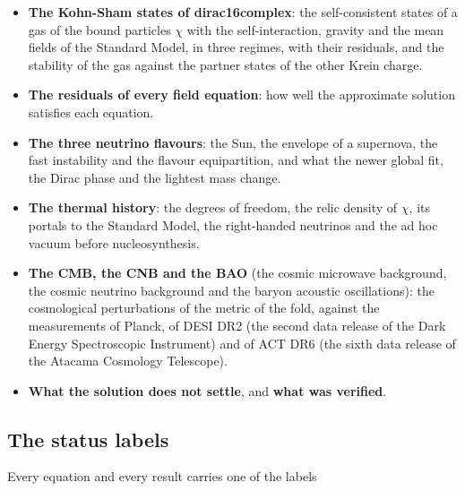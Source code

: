 \documentclass[
  10pt,
]{article}
\begin{document}
\begin{itemize}
  dirac16complex (the \(x_0\) mass), the speed of the bound particles
  \(\chi\) and the shortcut through the bulk.
\item
  \textbf{The Kohn-Sham states of dirac16complex}: the self-consistent
  states of a gas of the bound particles \(\chi\) with the
  self-interaction, gravity and the mean fields of the Standard Model,
  in three regimes, with their residuals, and the stability of the gas
  against the partner states of the other Krein charge.
\item
  \textbf{The residuals of every field equation}: how well the
  approximate solution satisfies each equation.
\item
  \textbf{The three neutrino flavours}: the Sun, the envelope of a
  supernova, the fast instability and the flavour equipartition, and
  what the newer global fit, the Dirac phase and the lightest mass
  change.
\item
  \textbf{The thermal history}: the degrees of freedom, the relic
  density of \(\chi\), its portals to the Standard Model, the
  right-handed neutrinos and the ad hoc vacuum before nucleosynthesis.
\item
  \textbf{The CMB, the CNB and the BAO} (the cosmic microwave
  background, the cosmic neutrino background and the baryon acoustic
  oscillations): the cosmological perturbations of the metric of the
  fold, against the measurements of Planck, of DESI DR2 (the second data
  release of the Dark Energy Spectroscopic Instrument) and of ACT DR6
  (the sixth data release of the Atacama Cosmology Telescope).
\item
  \textbf{What the solution does not settle}, and \textbf{what was
  verified}.
\end{itemize}

\hypertarget{the-status-labels}{%
\subsection{The status labels}\label{the-status-labels}}

Every equation and every result carries one of the labels
\end{document}
